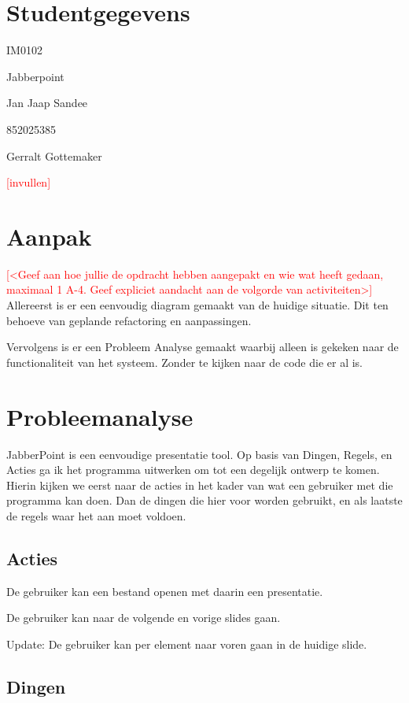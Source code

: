 \documentclass[a4paper]{article}
\newcommand{\todo}[1]{\textcolor{red}{[#1]}}
\begin{document}
\pagestyle{fancy}

\section*{Studentgegevens}
\begin{description}
	\item [Cursuscode] IM0102
	\item Jabberpoint
    \item Jan Jaap Sandee
	\item 852025385
	\item Gerralt Gottemaker
	\item [Studentnummer] \todo{invullen}
\end{description}

\section*{Aanpak}
\todo{<Geef aan hoe jullie de opdracht hebben aangepakt en wie wat heeft gedaan, maximaal 1 A-4. Geef expliciet aandacht aan de volgorde van activiteiten>}
Allereerst is er een eenvoudig diagram gemaakt van de huidige situatie. Dit ten
behoeve van geplande refactoring en aanpassingen.

Vervolgens is er een Probleem Analyse gemaakt waarbij alleen is gekeken naar de
functionaliteit van het systeem. Zonder te kijken naar de code die er al is.


\section{Probleemanalyse}
JabberPoint is een eenvoudige presentatie tool. Op basis van Dingen, Regels, en
Acties ga ik het programma uitwerken om tot een degelijk ontwerp te komen.
Hierin kijken we eerst naar de acties in het kader van wat een gebruiker met die
programma kan doen. Dan de dingen die hier voor worden gebruikt, en als laatste
de regels waar het aan moet voldoen.

\subsection{Acties}
De gebruiker kan een bestand openen met daarin een presentatie.

De gebruiker kan naar de volgende en vorige slides gaan.

Update: De gebruiker kan per element naar voren gaan in de huidige slide.

\subsection{Dingen}
\end{document}

